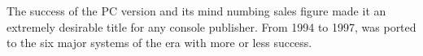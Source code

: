 The success of the PC version and its mind numbing sales figure made it an extremely desirable title for any console publisher. From 1994 to 1997, \doom{} was ported to the six major systems of the era with more or less success.\\
\par


